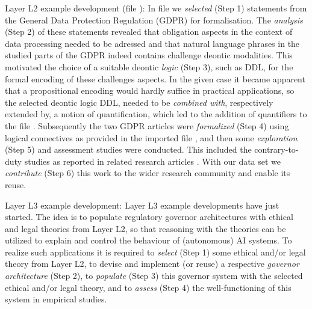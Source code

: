 \documentclass{article}
\begin{document}
\begin{description}
\item{Layer L2 example development (file \textsf{\small
      }):} In file \textsf{\small
    } we \textit{selected} (Step 1)
  statements from the General Data Protection Regulation (GDPR) for
  formalisation. The \textit{analysis} (Step 2) of these statements
  revealed that obligation aspects in the context of data processing
  needed to be adressed and that natural language phrases in the
  studied parts of the GDPR indeed contains challenge deontic
  modalities. This motivated the choice of a suitable deontic
  \textit{logic} (Step 3), such as DDL, for the formal encoding of
  these challenges aspects. In the given case it became apparent that
  a propositional encoding would hardly suffice in practical
  applications, so the selected deontic logic DDL, needed to be
  \textit{combined with}, respectively extended by, a notion of
  quantification, which led to the addition of quantifiers to the file
  \textsf{\small {}}. Subsequently the two GDPR
  articles were \textit{formalized} (Step 4) using logical connectives
  as provided in the imported file \textsf{\small
    }, and then some \textit{exploration} (Step
  5) and assessment studies were conducted. This included the
  contrary-to-duty studies as reported in related research articles
  \cite{J48,C71}. With our data set we \textit{contribute} (Step 6)
  this work to the wider research community and enable its reuse.

\item{Layer L3 example development:}  Layer L3 example developments
  have just started. The idea is to populate regulatory governor
  architectures \cite{J48}
  with ethical and legal theories from Layer L2, so that reasoning with the
  theories can be utilized to explain and control the behaviour of
  (autonomous) AI systems. To realize such applications it is required
  to \textit{select} (Step 1) some ethical and/or legal  theory from
  Layer L2, to
  devise and implement (or reuse) a respective \textit{governor architecture}
  (Step 2), to \textit{populate} (Step 3) this governor system with
  the selected ethical and/or legal   theory, and to \textit{assess} (Step 4) the
  well-functioning of this system in empirical studies.
\end{description} 
\end{document}
